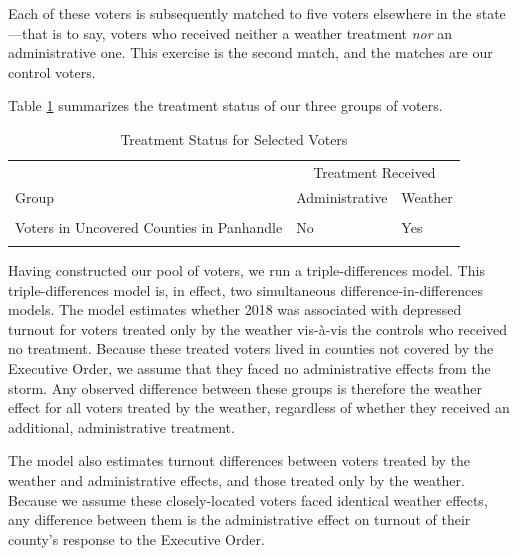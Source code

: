 \documentclass[
  12pt,
]{article}
\begin{document}
Each of these voters is subsequently matched to five voters elsewhere in the state---that is to say, voters who received neither a weather treatment \emph{nor} an administrative one. This exercise is the second match, and the matches are our control voters.

Table \ref{tab:groups} summarizes the treatment status of our three groups of voters.

\begin{singlespace}
\begin{table}[H]

\caption{\label{tab:groups-treat}\label{tab:groups} Treatment Status for Selected Voters}
\centering
\begin{tabular}[t]{>{\raggedright\arraybackslash}p{15em}ll}
\toprule
\multicolumn{1}{c}{ } & \multicolumn{2}{c}{Treatment Received} \\
\cmidrule(l{3pt}r{3pt}){2-3}
Group & Administrative & Weather\\
\midrule
\cellcolor{gray!6}{Voters in Covered Counties} & \cellcolor{gray!6}{Yes} & \cellcolor{gray!6}{Yes}\\
Voters in Uncovered Counties in Panhandle & No & Yes\\
\cellcolor{gray!6}{Voters Elsewhere} & \cellcolor{gray!6}{No} & \cellcolor{gray!6}{No}\\
\bottomrule
\end{tabular}
\end{table}
\end{singlespace}

Having constructed our pool of voters, we run a triple-differences model. This triple-differences model is, in effect, two simultaneous difference-in-differences models. The model estimates whether 2018 was associated with depressed turnout for voters treated only by the weather vis-à-vis the controls who received no treatment. Because these treated voters lived in counties not covered by the Executive Order, we assume that they faced no administrative effects from the storm. Any observed difference between these groups is therefore the weather effect for all voters treated by the weather, regardless of whether they received an additional, administrative treatment.

The model also estimates turnout differences between voters treated by the weather and administrative effects, and those treated only by the weather. Because we assume these closely-located voters faced identical weather effects, any difference between them is the administrative effect on turnout of their county's response to the Executive Order.
\end{document}
